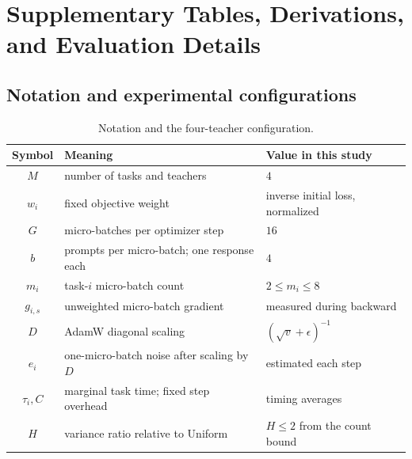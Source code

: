 \section{Supplementary Tables, Derivations, and Evaluation Details}

\subsection{Notation and experimental configurations}
\label{app:reference_tables}

\begin{table}[H]
\centering
\small
\caption{Notation and the four-teacher configuration.}
\label{tab:notation}
\begin{tabular}{cll}
\toprule
Symbol & Meaning & Value in this study \\
\midrule
$M$ & number of tasks and teachers & $4$ \\
$w_i$ & fixed objective weight & inverse initial loss, normalized \\
$G$ & micro-batches per optimizer step & $16$ \\
$b$ & prompts per micro-batch; one response each & $4$ \\
$m_i$ & task-$i$ micro-batch count & $2\leq m_i\leq8$ \\
$g_{i,s}$ & unweighted micro-batch gradient & measured during backward \\
$D$ & AdamW diagonal scaling & $(\sqrt v+\epsilon)^{-1}$ \\
$e_i$ & one-micro-batch noise after scaling by $D$ & estimated each step \\
$\tau_i,C$ & marginal task time; fixed step overhead & timing averages \\
$H$ & variance ratio relative to Uniform & $H\leq2$ from the count bound \\
\bottomrule
\end{tabular}
\end{table}

